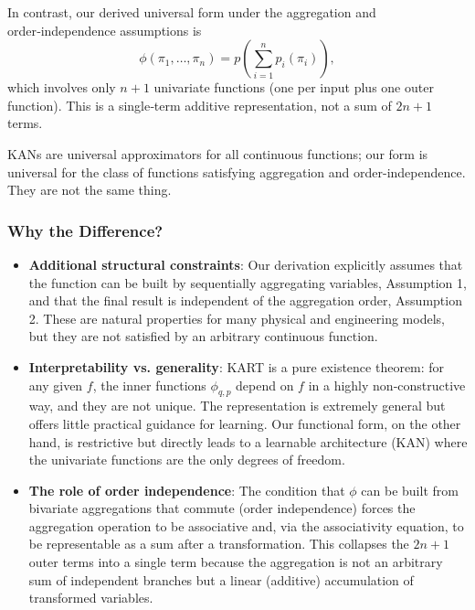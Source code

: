 In contrast, our derived universal form under the aggregation and order‑independence assumptions is
\[
\boxed{
\phi(\pi_1,\dots,\pi_n) = p\!\left( \sum_{i=1}^n p_i(\pi_i) \right),}
\]
which involves only $n+1$ univariate functions (one per input plus one outer function). This is a single‑term additive representation, not a sum of $2n+1$ terms.

KANs are universal approximators for all continuous functions; our form is universal for the class of functions satisfying aggregation and order-independence. They are not the same thing.

\subsubsection*{Why the Difference?}
\begin{itemize}
\item \textbf{Additional structural constraints}: Our derivation explicitly assumes that the function can be built by sequentially aggregating variables, Assumption 1, and that the final result is independent of the aggregation order, Assumption 2. These are natural properties for many physical and engineering models, but they are not satisfied by an arbitrary continuous function.
\item \textbf{Interpretability vs. generality}: KART is a pure existence theorem: for any given $f$, the inner functions $\phi_{q,p}$ depend on $f$ in a highly non‑constructive way, and they are not unique. The representation is extremely general but offers little practical guidance for learning. Our functional form, on the other hand, is restrictive but directly leads to a learnable architecture (KAN) where the univariate functions are the only degrees of freedom.
\item \textbf{The role of order independence}: The condition that $\phi$ can be built from bivariate aggregations that commute (order independence) forces the aggregation operation to be associative and, via the associativity equation, to be representable as a sum after a transformation. This collapses the $2n+1$ outer terms into a single term because the aggregation is not an arbitrary sum of independent branches but a linear (additive) accumulation of transformed variables.
\end{itemize}

